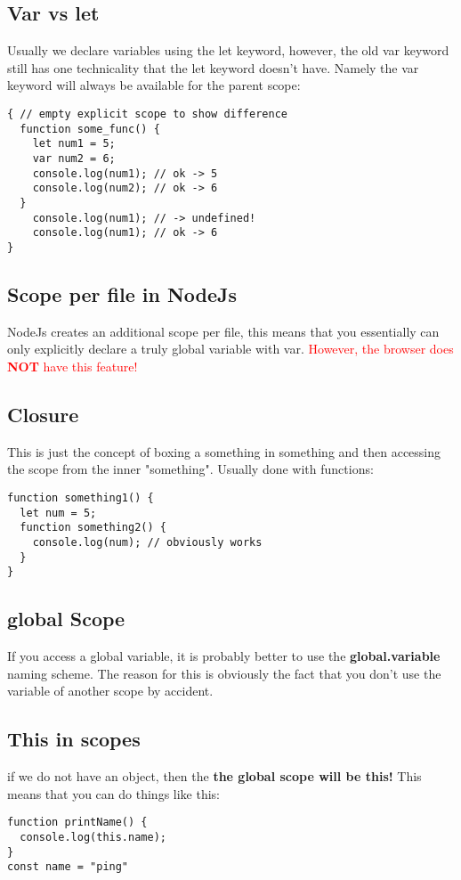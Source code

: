 \documentclass[main.tex,fontsize=6pt,paper=a4,paper=landscape,DIV=calc,]{scrartcl}
\begin{document}
\begin{multicols*}{4}
\subsection{Var vs let}  
Usually we declare variables using the let keyword, however, the old var keyword still has one technicality that the let keyword doesn't have. Namely the var keyword will always be available for the parent scope:
\vspace{-2mm}
\begin{lstlisting}
{ // empty explicit scope to show difference
  function some_func() {
    let num1 = 5;
    var num2 = 6;
    console.log(num1); // ok -> 5
    console.log(num2); // ok -> 6
  }
    console.log(num1); // -> undefined!
    console.log(num1); // ok -> 6
}
\end{lstlisting}
\vspace{2mm}

\subsection{Scope per file in NodeJs} 
NodeJs creates an additional scope per file, this means that you essentially can only explicitly declare a truly global variable with var.\newline
\textcolor{red}{However, the browser does \textbf{NOT} have this feature!}

\subsection{Closure}  
This is just the concept of boxing a something in something and then accessing the scope from the inner "something". Usually done with functions:
\vspace{-2mm}
\begin{lstlisting}
function something1() {
  let num = 5;
  function something2() {
    console.log(num); // obviously works
  }
}
\end{lstlisting}
\vspace{2mm}

\subsection{global Scope}  
If you access a global variable, it is probably better to use the \textbf{global.variable} naming scheme. The reason for this is obviously the fact that you don't use the variable of another scope by accident.

\subsection{This in scopes}  
if we do not have an object, then the \textbf{the global scope will be this!}\newline
This means that you can do things like this:
\vspace{-2mm}
\begin{lstlisting}
function printName() {
  console.log(this.name);
}
const name = "ping"


\end{lstlisting}
\end{multicols*}
\end{document}
